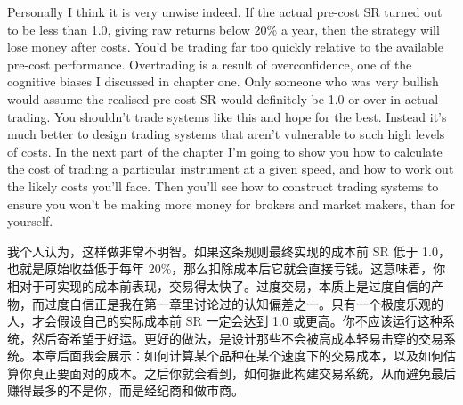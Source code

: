 \bipairgap

\begin{englishblock} Personally I think it is very unwise indeed. If the actual pre-cost SR turned out to be less than 1.0, giving raw returns below 20\% a year, then the strategy will lose money after costs. You'd be trading far too quickly relative to the available pre-cost performance. Overtrading is a result of overconfidence, one of the cognitive biases I discussed in chapter one. Only someone who was very bullish would assume the realised pre-cost SR would definitely be 1.0 or over in actual trading. You shouldn't trade systems like this and hope for the best. Instead it's much better to design trading systems that aren't vulnerable to such high levels of costs. In the next part of the chapter I'm going to show you how to calculate the cost of trading a particular instrument at a given speed, and how to work out the likely costs you'll face. Then you'll see how to construct trading systems to ensure you won't be making more money for brokers and market makers, than for yourself. \end{englishblock}

\begin{chineseblock}我个人认为，这样做非常不明智。如果这条规则最终实现的成本前 SR 低于 1.0，也就是原始收益低于每年 20\%，那么扣除成本后它就会直接亏钱。这意味着，你相对于可实现的成本前表现，交易得太快了。过度交易，本质上是过度自信的产物，而过度自信正是我在第一章里讨论过的认知偏差之一。只有一个极度乐观的人，才会假设自己的实际成本前 SR 一定会达到 1.0 或更高。你不应该运行这种系统，然后寄希望于好运。更好的做法，是设计那些不会被高成本轻易击穿的交易系统。本章后面我会展示：如何计算某个品种在某个速度下的交易成本，以及如何估算你真正要面对的成本。之后你就会看到，如何据此构建交易系统，从而避免最后赚得最多的不是你，而是经纪商和做市商。\end{chineseblock}



